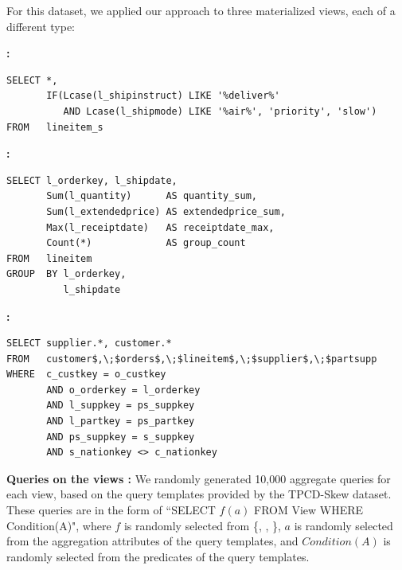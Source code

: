 For this dataset, we applied our approach to three materialized views, each of a different type:

\vspace{0.5em}

{\noindent \bf \spview :}\vspace{-0.25em}
\begin{lstlisting}
SELECT *, 
       IF(Lcase(l_shipinstruct) LIKE '%deliver%' 
          AND Lcase(l_shipmode) LIKE '%air%', 'priority', 'slow') 
FROM   lineitem_s 
\end{lstlisting}

\vspace{0.5em}

{\noindent \bf \aggview :}\vspace{-0.25em}
\begin{lstlisting}
SELECT l_orderkey, l_shipdate, 
       Sum(l_quantity)      AS quantity_sum, 
       Sum(l_extendedprice) AS extendedprice_sum, 
       Max(l_receiptdate)   AS receiptdate_max, 
       Count(*)             AS group_count 
FROM   lineitem 
GROUP  BY l_orderkey, 
          l_shipdate 
\end{lstlisting}

\vspace{0.5em}

{\noindent \bf \fjview :}\vspace{-0.25em}
\begin{lstlisting}[mathescape]
SELECT supplier.*, customer.* 
FROM   customer$,\;$orders$,\;$lineitem$,\;$supplier$,\;$partsupp 
WHERE  c_custkey = o_custkey 
       AND o_orderkey = l_orderkey 
       AND l_suppkey = ps_suppkey 
       AND l_partkey = ps_partkey 
       AND ps_suppkey = s_suppkey 
       AND s_nationkey <> c_nationkey 
\end{lstlisting}

\vspace{0.5em}


{\noindent \bf Queries on the views :}
We randomly generated 10,000 aggregate queries for each view, based on the query templates provided by the TPCD-Skew dataset. These queries are in the form of ``SELECT $f(a)$ FROM View WHERE Condition(A)", where $f$ is randomly selected from \{\sumfunc, \countfunc, \avgfunc\}, $a$ is randomly selected from the  aggregation attributes of the query templates, and $Condition(A)$ is randomly selected from the predicates of the query templates.


